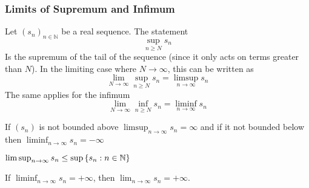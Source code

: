 \documentclass[../notes.tex]{subfiles}
\begin{document}
\subsubsection{Limits of Supremum and Infimum}
\begin{definition}
    Let $(s_n)_{n \in \mathbb{N}}$ be a real sequence. The statement
    \[
        \sup_{n \geq N} s_n
    \]
    Is the supremum of the tail of the sequence (since it only acts on terms greater than $N$). In the limiting case where $N \to \infty$, this can be written as
    \[
        \lim_{N \to \infty} \sup_{n \geq N} s_n = \limsup_{n\to\infty} s_n
    \]
    The same applies for the infimum
    \[
        \lim_{N \to \infty} \inf_{n \geq N} s_n = \liminf_{n\to\infty} s_n
    \]
\end{definition}
\begin{remark}
    If $(s_n)$ is not bounded above $\limsup_{n \to \infty} s_n = \infty$ and if it not bounded below then $\liminf_{n \to \infty} s_n = -\infty$
\end{remark}

\begin{theorem}
    $\limsup_{n\to \infty} s_n \leq \sup\qty{s_n : n \in \mathbb{N}}$
\end{theorem}

\begin{theorem}
    If $\liminf_{n \to \infty} s_n = +\infty$, then $\lim_{n \to \infty} s_n = +\infty$.
\end{theorem}
\end{document}
